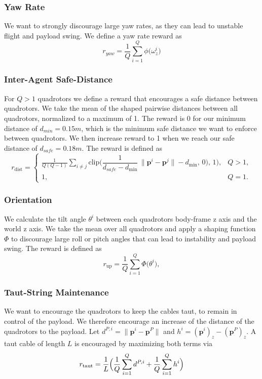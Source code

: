 \subsubsection{Yaw Rate}
We want to strongly discourage large yaw rates, as they can lead to unstable flight and payload swing. We define a yaw rate reward as
\begin{equation}
r_{yaw}
= \frac{1}{Q}\sum_{i=1}^{Q}\phi\bigl(\omega_z^i\bigr)
\end{equation}
\subsubsection{Inter-Agent Safe-Distance}
For $Q>1$ quadrotors we define a reward that encourages a safe distance between quadrotors. We take the mean of the shaped pairwise distances between all quadrotors, normalized to a maximum of 1. The reward is 0 for our minimum distance of $d_{min}= 0.15 m$, which is the minimum safe distance we want to enforce between quadrotors. We then increase reward to 1 when we reach our safe distance of $d_{safe}=0.18 m$. The reward is defined as
\begin{equation}
r_{\mathrm{dist}} =
\begin{cases}
\displaystyle
\frac{1}{Q(Q-1)} \sum_{i \neq j}
\mathrm{clip}\bigl(\dfrac{1}{d_{safe}-d_{\min}}\,\|\mathbf{p}^i - \mathbf{p}^j\| - d_{\min},\,0),\,1\bigr),
& Q > 1,\\[1.5ex]
1, & Q = 1.
\end{cases}
\end{equation}

\subsubsection{Orientation}
We calculate the tilt angle \(\theta^i\) between each quadrotors body-frame z axis and the world z axis. We take the mean over all quadrotors and apply a shaping function \(\Phi\) to discourage large roll or pitch angles that can lead to instability and payload swing. The reward is defined as
\begin{equation}
r_{\mathrm{up}}
= \frac{1}{Q}\sum_{i=1}^Q \Phi\bigl(\theta^i\bigr),
\end{equation}

\subsubsection{Taut-String Maintenance}
We want to encourage the quadrotors to keep the cables taut, to remain in control of the payload. We therefore encourage an increase of the distance of the quadrotors to the payload. Let \(d^{P,i}=\lVert\mathbf{p}^i-\mathbf{p}^P\rVert\) and \(h^i=(\mathbf{p}^i)_z-(\mathbf{p}^P)_z\). A taut cable of length \(L\) is encouraged by maximizing both terms via
\begin{equation}
r_{\mathrm{taut}}
= \frac{1}{L}\Bigl(\frac{1}{Q}\sum_{i=1}^Q d^{P,i} + \frac{1}{Q}\sum_{i=1}^Q h^i\Bigr)
\end{equation}


